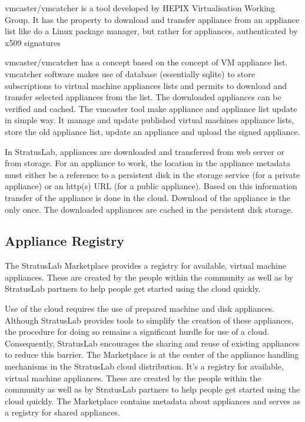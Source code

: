 vmcaster/vmcatcher is a tool developed by HEPIX Virtualisation Working
Group. It has the property to download and transfer appliance from an
appliance list like do a Linux package manager, but rather for
appliances, authenticated by x509 signatures

vmcaster/vmcatcher has a concept based on the concept of VM appliance
list.  vmcatcher software makes use of database (essentially sqlite)
to store subscriptions to virtual machine appliances lists and permits
to download and transfer selected appliances from the list. The
downloaded appliances can be verified and cached.  The vmcaster tool
make appliance and appliance list update in simple way. It manage and
update published virtual machines appliance lists, store the old
appliance list, update an appliance and upload the signed appliance.

In StratusLab, appliances are downloaded and transferred from web
server or from storage. For an appliance to work, the location in the
appliance metadata must either be a reference to a persistent disk in
the storage service (for a private appliance) or an http(s) URL (for a
public appliance). Based on this information transfer of the appliance
is done in the cloud.  Download of the appliance is the only once. The
downloaded appliances are cached in the persistent disk storage.

\subsection{Appliance Registry}

The StratusLab Marketplace provides a registry for available, virtual
machine appliances. These are created by the people within the
community as well as by StratusLab partners to help people get started
using the cloud quickly.

Use of the cloud requires the use of prepared machine and disk
appliances. Although StratusLab provides tools to simplify the
creation of these appliances, the procedure for doing so remains a
significant hurdle for use of a cloud. Consequently, StratusLab
encourages the sharing and reuse of existing appliances to reduce this
barrier.  The Marketplace is at the center of the appliance handling
mechanisms in the StratusLab cloud distribution. It's a registry for
available, virtual machine appliances. These are created by the people
within the community as well as by StratusLab partners to help people
get started using the cloud quickly.  The Marketplace contains
metadata about appliances and serves as a registry for shared
appliances.

